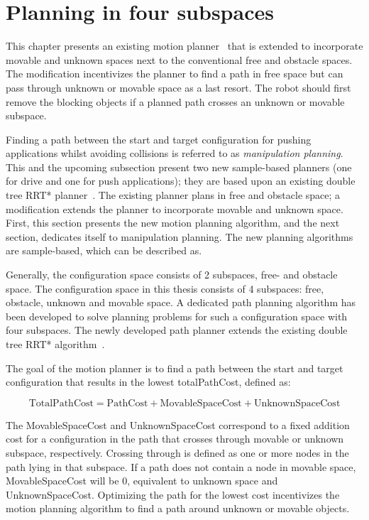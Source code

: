 
\chapter{Planning in four subspaces}%
\label{chap:proposed_planning}
This chapter presents an existing motion planner~\cite{chen_fast_2018} that is extended to incorporate movable and unknown spaces next to the conventional free and obstacle spaces. The modification incentivizes the planner to find a path in free space but can pass through unknown or movable space as a last resort. The robot should first remove the blocking objects if a planned path crosses an unknown or movable subspace.\bs


Finding a path between the start and target configuration for pushing applications whilst avoiding collisions is referred to as \textit{manipulation planning}. This and the upcoming subsection present two new sample-based planners (one for drive and one for push applications); they are based upon an existing double tree \ac{RRT*} planner~\cite{chen_fast_2018}. The existing planner plans in free and obstacle space; a modification extends the planner to incorporate movable and unknown space. First, this section presents the new motion planning algorithm, and the next section,  dedicates itself to manipulation planning. The new planning algorithms are sample-based, which can be described as.


Generally, the configuration space consists of 2 subspaces, free- and obstacle space. The configuration space in this thesis consists of 4 subspaces: free, obstacle, unknown and movable space. A dedicated path planning algorithm has been developed to solve planning problems for such a configuration space with four subspaces. The newly developed path planner extends the existing double tree \ac{RRT*} algorithm~\cite{chen_fast_2018}.


The goal of the motion planner is to find a path between the start and target configuration that results in the lowest totalPathCost, defined as:

\[\textrm{TotalPathCost} = \textrm{PathCost} + \textrm{MovableSpaceCost} + \textrm{UnknownSpaceCost}\]


 The MovableSpaceCost and UnknownSpaceCost correspond to a fixed addition cost for a configuration in the path that crosses through movable or unknown subspace, respectively. Crossing through is defined as one or more nodes in the path lying in that subspace. If a path does not contain a node in movable space, MovableSpaceCost will be 0, equivalent to unknown space and UnknownSpaceCost. Optimizing the path for the lowest cost incentivizes the motion planning algorithm to find a path around unknown or movable objects.

